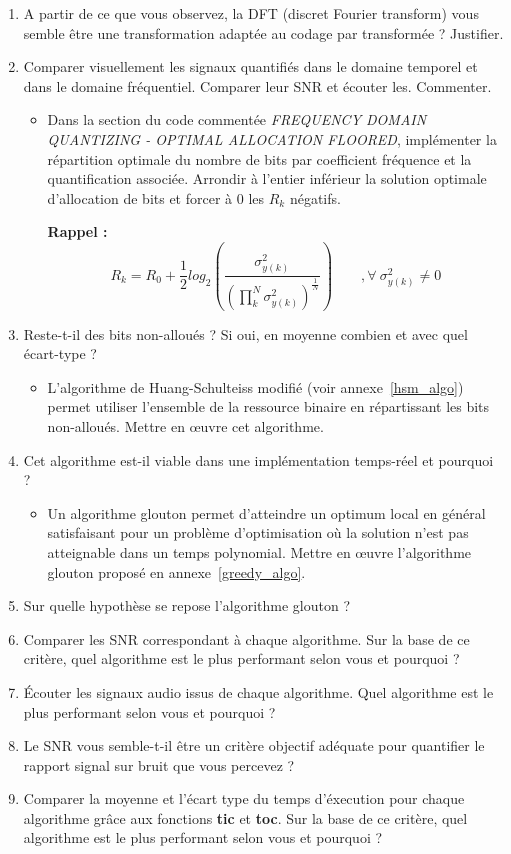 \documentclass{article}
\begin{document}
\begin{enumerate}[label=\textbf{\arabic*})]
	\item A partir de ce que vous observez, la DFT (discret Fourier transform) vous semble être une transformation adaptée au codage par transformée ? Justifier.
	\item Comparer visuellement les signaux quantifiés dans le domaine temporel et dans le domaine fréquentiel. Comparer leur SNR et écouter les. Commenter.
	
	\begin{itemize}
		\item Dans la section du code commentée \emph{FREQUENCY DOMAIN QUANTIZING - OPTIMAL ALLOCATION FLOORED}, implémenter la répartition optimale du nombre de bits par coefficient fréquence et la quantification associée. Arrondir à l'entier inférieur la solution optimale d'allocation de bits et forcer à 0 les $R_k$ négatifs.
		
		\textbf{Rappel :}
		$$
		R_k = R_0 + \frac{1}{2} log_2\left(\frac{\sigma_{y(k)}^2}{\left(\prod\limits_k^N \sigma_{y(k)}^2\right)^{\frac{1}{ N}}}\right)
		\qquad , \forall \ \sigma_{y(k)}^2 \neq 0
		$$
	\end{itemize}

	\item Reste-t-il des bits non-alloués ? Si oui, en moyenne combien et avec quel écart-type ?
	
	\begin{itemize}
		\item L’algorithme de Huang-Schulteiss modifié (voir annexe~\ref{hsm_algo}) permet utiliser l’ensemble de la ressource binaire en répartissant les bits non-alloués. Mettre en \oe uvre cet algorithme.
	\end{itemize}
	\item Cet algorithme est-il viable dans une implémentation temps-réel et pourquoi ?
	\begin{itemize}
		\item Un algorithme glouton permet d'atteindre un optimum local en général satisfaisant pour un problème d'optimisation où la solution n'est pas atteignable dans un temps polynomial. Mettre en œuvre l’algorithme glouton proposé en annexe~\ref{greedy_algo}.
	\end{itemize}
	\item Sur quelle hypothèse se repose l'algorithme glouton ?
	\item Comparer les SNR correspondant à chaque algorithme. Sur la base de ce critère, quel algorithme est le plus performant selon vous et pourquoi ?
	\item Écouter les signaux audio issus de chaque algorithme. Quel algorithme est le plus performant selon vous et pourquoi ?
	\item Le SNR vous semble-t-il être un critère objectif adéquate pour quantifier le rapport signal sur bruit que vous percevez ?
	\item Comparer la moyenne et l'écart type du temps d'éxecution pour chaque algorithme grâce aux fonctions \textbf{tic} et \textbf{toc}. Sur la base de ce critère, quel algorithme est le plus performant selon vous et pourquoi ?
	
\end{enumerate}
\end{document}
